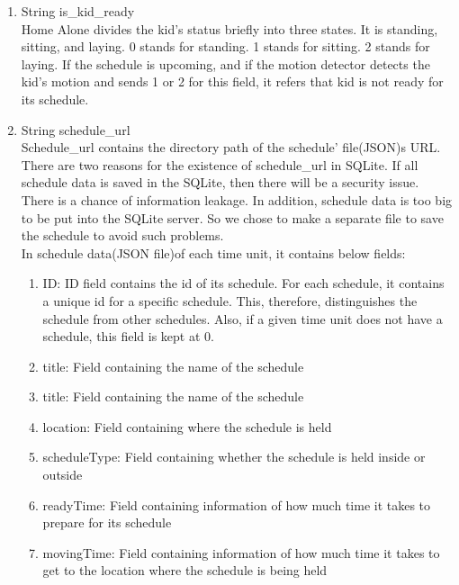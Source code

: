 \documentclass[conference]{IEEEtran}
\begin{document}
\begin{enumerate}[label=\arabic*.]
\begin{enumerate}[label=\arabic*.]
\begin{enumerate}[label=\alph*.]
        \item {\large{String is\_kid\_ready}} \\
        Home Alone divides the kid’s status briefly into three states. It is standing, sitting, and laying. 0 stands for standing. 1 stands for sitting. 2 stands for laying. If the schedule is upcoming, and if the motion detector detects the kid’s motion and sends 1 or 2 for this field, it refers that kid is not ready for its schedule. \\
        \item {\large{String schedule\_url}} \\
        Schedule\_url contains the directory path of the schedule’ file(JSON)s URL. There are two reasons for the existence of schedule\_url in SQLite. If all schedule data is saved in the SQLite, then there will be a security issue. There is a chance of information leakage. In addition, schedule data is too big to be put into the SQLite server. So we chose to make a separate file to save the schedule to avoid such problems. \\
        In schedule data(JSON file)of each time unit, it contains below fields: \\
        \begin{enumerate}[label=\roman*.]
            \item {\large{ID: ID field contains the id of its schedule. For each schedule, it contains a unique id for a specific schedule. This, therefore, distinguishes the schedule from other schedules. Also, if a given time unit does not have a schedule, this field is kept at 0. }} \\
            \item {\large{title: Field containing the name of the schedule }} \\
            \item {\large{title: Field containing the name of the schedule }} \\
            \item {\large{location: Field containing where the schedule is held }} \\
            \item {\large{scheduleType: Field containing whether the schedule is held inside or outside }} \\
            \item {\large{readyTime: Field containing information of how much time it takes to prepare for its schedule }} \\
            \item {\large{movingTime: Field containing information of how much time it takes to get to the location where the schedule is being held}} \\   

\end{enumerate}
\end{enumerate}
\end{enumerate}
\end{enumerate}
\end{document}

